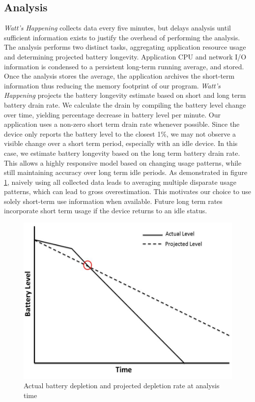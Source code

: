 \subsection{Analysis}
\label{subsec:impl_analysis}
\emph{Watt's Happening} collects data every five minutes, but delays analysis until sufficient information exists to justify the overhead of performing the analysis.
The analysis performs two distinct tasks, aggregating application resource usage and determining projected battery longevity.
Application CPU and network I/O information is condensed to a persistent long-term running average, and stored.
Once the analysis stores the average, the application archives the short-term information thus reducing the memory footprint of our program.
\emph{Watt's Happening} projects the battery longevity estimate based on short and long term battery drain rate.
We calculate the drain by compiling the battery level change over time, yielding  percentage decrease in battery level per minute. 
Our application uses a non-zero short term drain rate whenever possible.
Since the device only reports the battery level to the closest 1\%, we may not observe a visible change over a short term period, especially with an idle device.
In this case, we estimate battery longevity based on the long term battery drain rate.
This allows a highly responsive model based on changing usage patterns, while still maintaining accuracy over long term idle periods.
As demonstrated in figure \ref{fig:bat_v_time}, naively using all collected data leads to averaging multiple disparate usage patterns, which can lead to gross overestimation.  
This motivates our choice to use solely short-term use information when available.
Future long term rates incorporate short term usage if the device returns to an idle status.
\begin{figure}[ht!]
	\begin{center}
		\includegraphics[width=\columnwidth]{figs/bat_vs_time.png}
		\caption{Actual battery depletion and projected depletion rate at analysis time}
		\label{fig:bat_v_time}
\end{center}
\end{figure}
